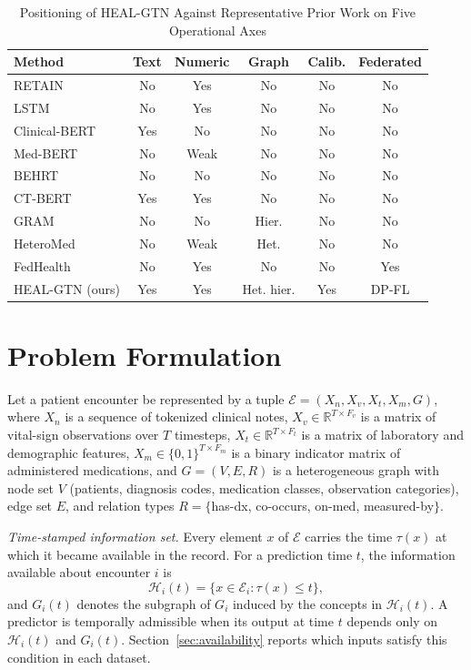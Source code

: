 \documentclass[conference]{IEEEtran}
\begin{document}
\begin{table}[t]
\caption{Positioning of HEAL-GTN Against Representative Prior Work on Five Operational Axes}
\label{tab:position}
\centering
\footnotesize
\setlength{\tabcolsep}{3.5pt}
\begin{tabular}{@{}lccccc@{}}
\toprule
Method & Text & Numeric & Graph & Calib. & Federated \\
\midrule
RETAIN \cite{choi2016retain} & No & Yes & No & No & No \\
LSTM \cite{harutyunyan2019} & No & Yes & No & No & No \\
Clinical-BERT \cite{alsentzer2019} & Yes & No & No & No & No \\
Med-BERT \cite{rasmy2021medbert} & No & Weak & No & No & No \\
BEHRT \cite{li2020behrt} & No & No & No & No & No \\
CT-BERT \cite{yang2022gatortron} & Yes & Yes & No & No & No \\
GRAM \cite{choi2017gram} & No & No & Hier. & No & No \\
HeteroMed \cite{hosseini2018heteromed} & No & Weak & Het. & No & No \\
FedHealth \cite{chen2020fedhealth} & No & Yes & No & No & Yes \\
\midrule
HEAL-GTN (ours) & Yes & Yes & Het. hier. & Yes & DP-FL \\
\bottomrule
\end{tabular}
\end{table}

\section{Problem Formulation}\label{sec:problem}
Let a patient encounter be represented by a tuple $\mathcal{E}=(X_n,X_v,X_t,X_m,G)$, where $X_n$ is a sequence of tokenized clinical notes, $X_v\in\mathbb{R}^{T\times F_v}$ is a matrix of vital-sign observations over $T$ timesteps, $X_t\in\mathbb{R}^{T\times F_t}$ is a matrix of laboratory and demographic features, $X_m\in\{0,1\}^{T\times F_m}$ is a binary indicator matrix of administered medications, and $G=(V,E,R)$ is a heterogeneous graph with node set $V$ (patients, diagnosis codes, medication classes, observation categories), edge set $E$, and relation types $R=\{$has-dx, co-occurs, on-med, measured-by$\}$.

\textit{Time-stamped information set.} Every element $x$ of $\mathcal{E}$ carries the time $\tau(x)$ at which it became available in the record. For a prediction time $t$, the information available about encounter $i$ is
\begin{equation}
\mathcal{H}_i(t)=\{x\in\mathcal{E}_i:\tau(x)\le t\},
\label{eq:info}
\end{equation}
and $G_i(t)$ denotes the subgraph of $G_i$ induced by the concepts in $\mathcal{H}_i(t)$. A predictor is temporally admissible when its output at time $t$ depends only on $\mathcal{H}_i(t)$ and $G_i(t)$. Section~\ref{sec:availability} reports which inputs satisfy this condition in each dataset.
\end{document}
